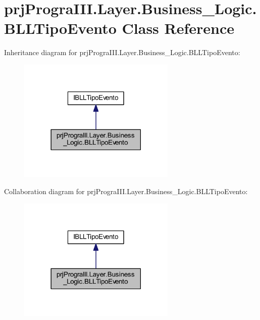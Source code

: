 \hypertarget{classprj_progra_i_i_i_1_1_layer_1_1_business___logic_1_1_b_l_l_tipo_evento}{}\section{prj\+Progra\+I\+I\+I.\+Layer.\+Business\+\_\+\+Logic.\+B\+L\+L\+Tipo\+Evento Class Reference}
\label{classprj_progra_i_i_i_1_1_layer_1_1_business___logic_1_1_b_l_l_tipo_evento}


Inheritance diagram for prj\+Progra\+I\+I\+I.\+Layer.\+Business\+\_\+\+Logic.\+B\+L\+L\+Tipo\+Evento\+:
\nopagebreak
\begin{figure}[H]
\begin{center}
\leavevmode
\includegraphics[width=213pt]{classprj_progra_i_i_i_1_1_layer_1_1_business___logic_1_1_b_l_l_tipo_evento__inherit__graph}
\end{center}
\end{figure}


Collaboration diagram for prj\+Progra\+I\+I\+I.\+Layer.\+Business\+\_\+\+Logic.\+B\+L\+L\+Tipo\+Evento\+:
\nopagebreak
\begin{figure}[H]
\begin{center}
\leavevmode
\includegraphics[width=213pt]{classprj_progra_i_i_i_1_1_layer_1_1_business___logic_1_1_b_l_l_tipo_evento__coll__graph}
\end{center}
\end{figure}
